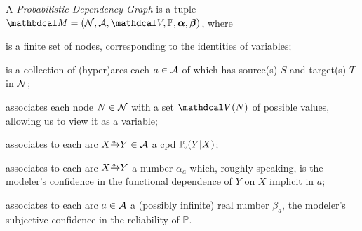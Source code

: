 %

\begin{defn}
    \label{def:model}
A \emph{Probabilistic Dependency Graph}
is a tuple $\dg M = (\N,\Ar,\V,\mathbb P, \balpha, \bbeta)$, where 
%
\begin{description}[topsep=0pt]%
	\item[$\N$] 
		is a finite set of nodes, corresponding to the identities of variables;
	\item[$\Ar$] 
		is a collection of (hyper)arcs each $a\in \mathcal A$ of which has source(s) $S$ and target(s) $T$ in $\N$;
	\item[$\V$]
		associates each node $N \in \mathcal N$ with a set $\V(N)$ of possible values, allowing us to view it as a variable;
  	\item[$\mathbb P$]
		associates to each arc $\ed aXY \in \Ar$
		a cpd $\p_a(Y|X)$;

\item[$\balpha$] 
associates to each arc $\ed aXY$ a number $\alpha_a$ which,
roughly speaking, is the modeler's confidence in the functional
dependence of $Y$ on $X$ implicit in $a$; 
\item[$\bbeta$] 
	associates to each arc $a \in \mathcal A$ a (possibly infinite) real number $\beta_a$,
	the modeler's 
	subjective confidence in the reliability of
	$\mathbb P$. 
\end{description}


\end{defn}
